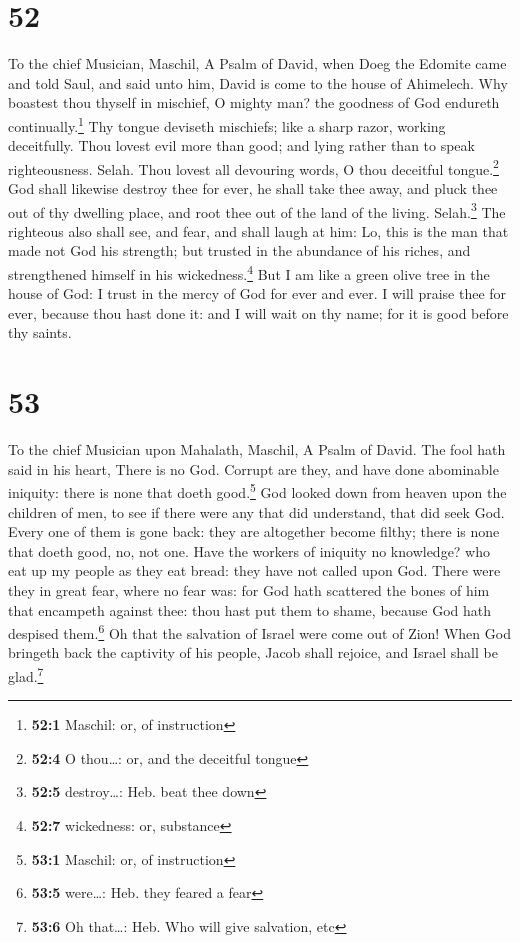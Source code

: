 \hypertarget{section-51}{%
\section{52}\label{section-51}}

To the chief Musician, Maschil, A Psalm of David, when Doeg the Edomite
came and told Saul, and said unto him, David is come to the house of
Ahimelech.  Why boastest thou thyself in mischief, O
mighty man? the goodness of God endureth continually.\footnote{\textbf{52:1}
  Maschil: or, of instruction}  Thy tongue deviseth
mischiefs; like a sharp razor, working deceitfully.  Thou
lovest evil more than good; and lying rather than to speak
righteousness. Selah.  Thou lovest all devouring words, O
thou deceitful tongue.\footnote{\textbf{52:4} O thou\ldots: or, and the
  deceitful tongue}  God shall likewise destroy thee for
ever, he shall take thee away, and pluck thee out of thy dwelling place,
and root thee out of the land of the living. Selah.\footnote{\textbf{52:5}
  destroy\ldots: Heb. beat thee down}  The righteous also
shall see, and fear, and shall laugh at him:  Lo, this is
the man that made not God his strength; but trusted in the abundance of
his riches, and strengthened himself in his wickedness.\footnote{\textbf{52:7}
  wickedness: or, substance}  But I am like a green olive
tree in the house of God: I trust in the mercy of God for ever and ever.
 I will praise thee for ever, because thou hast done it:
and I will wait on thy name; for it is good before thy saints.

\hypertarget{section-52}{%
\section{53}\label{section-52}}

To the chief Musician upon Mahalath, Maschil, A Psalm of David.
 The fool hath said in his heart, There is no God. Corrupt
are they, and have done abominable iniquity: there is none that doeth
good.\footnote{\textbf{53:1} Maschil: or, of instruction} 
God looked down from heaven upon the children of men, to see if there
were any that did understand, that did seek God.  Every
one of them is gone back: they are altogether become filthy; there is
none that doeth good, no, not one.  Have the workers of
iniquity no knowledge? who eat up my people as they eat bread: they have
not called upon God.  There were they in great fear, where
no fear was: for God hath scattered the bones of him that encampeth
against thee: thou hast put them to shame, because God hath despised
them.\footnote{\textbf{53:5} were\ldots: Heb. they feared a fear}
 Oh that the salvation of Israel were come out of Zion!
When God bringeth back the captivity of his people, Jacob shall rejoice,
and Israel shall be glad.\footnote{\textbf{53:6} Oh that\ldots: Heb. Who
  will give salvation, etc}

